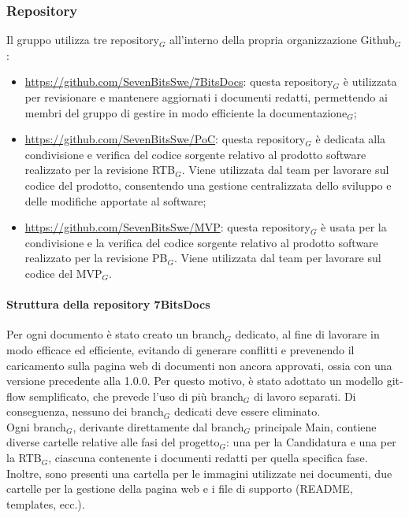 \documentclass[10pt]{article}
\begin{document}
\begin{justify}
    \subsubsection{Repository}
    Il gruppo utilizza tre repository$_G$ all'interno della propria organizzazione Github$_G$:
    \begin{itemize}
        \item \href{https://github.com/SevenBitsSwe/7BitsDocs}{https://github.com/SevenBitsSwe/7BitsDocs}: questa repository$_G$ è utilizzata per revisionare e mantenere aggiornati i documenti redatti, permettendo ai membri del gruppo di gestire in modo efficiente la documentazione$_G$;
        \item \href{https://github.com/SevenBitsSwe/PoC}{https://github.com/SevenBitsSwe/PoC}: questa repository$_G$ è dedicata alla condivisione e verifica del codice sorgente relativo al prodotto software realizzato per la revisione RTB$_G$. Viene utilizzata dal team per lavorare sul codice del prodotto, consentendo una gestione centralizzata dello sviluppo e delle modifiche apportate al software;
        \item \href{https://github.com/SevenBitsSwe/MVP}{https://github.com/SevenBitsSwe/MVP}: questa repository$_G$ è usata per la condivisione e la verifica del codice sorgente relativo al prodotto software realizzato per la revisione PB$_G$. Viene utilizzata dal team per lavorare sul codice del MVP$_G$.
    \end{itemize}

        \paragraph{Struttura della repository 7BitsDocs}
        Per ogni documento è stato creato un branch$_G$ dedicato, al fine di lavorare in modo efficace ed efficiente, evitando di generare conflitti e prevenendo il caricamento sulla pagina web di documenti non ancora approvati, ossia con una versione precedente alla 1.0.0. Per questo motivo, è stato adottato un modello git-flow semplificato, che prevede l'uso di più branch$_G$ di lavoro separati. Di conseguenza, nessuno dei branch$_G$ dedicati deve essere eliminato.\\
        Ogni branch$_G$, derivante direttamente dal branch$_G$ principale Main, contiene diverse cartelle relative alle fasi del progetto$_G$: una per la Candidatura e una per la RTB$_G$, ciascuna contenente i documenti redatti per quella specifica fase. Inoltre, sono presenti una cartella per le immagini utilizzate nei documenti, due cartelle per la gestione della pagina web e i file di supporto (README, templates, ecc.).


\end{justify}
\end{document}
